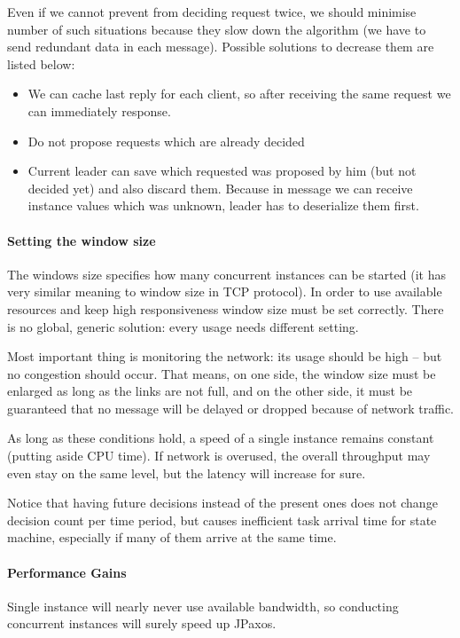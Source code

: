 Even if we cannot prevent from deciding request twice, we should minimise number of such situations because they slow down the algorithm (we have to send redundant data in each message). Possible solutions to decrease them are listed below:
\begin{itemize}
  \item We can cache last reply for each client, so after receiving the same request we can immediately response.
  \item Do not propose requests which are already decided
  \item Current leader can save which requested was proposed by him (but not decided yet) and also discard them. Because in \prepareOK message we can receive instance values which was unknown, leader has to deserialize them first.
\end{itemize}

\paragraph{Setting the window size}
The windows size specifies how many concurrent instances can be started (it has very similar meaning to window size in TCP protocol). In order to use available resources and keep high responsiveness window size must be set correctly. There is no global, generic solution: every usage needs different setting.

Most important thing is monitoring the network: its usage should be high -- but no congestion should occur.
That means, on one side, the window size must be enlarged as long as the links are not full, and on the other side, it must be guaranteed that no message will be delayed or dropped because of network traffic.

As long as these conditions hold, a speed of a single instance remains constant (putting aside CPU time).
If network is overused, the overall throughput may even stay on the same level, but the latency will increase for sure.

Notice that having future decisions instead of the present ones does not change decision count per time period, but causes inefficient task arrival time for state machine, especially if many of them arrive at the same time.

\paragraph{Performance Gains}
Single instance will nearly never use available bandwidth, so conducting concurrent instances will surely speed up JPaxos.

